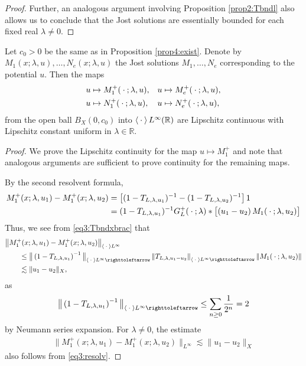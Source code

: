 \documentclass[../dissertation.tex]{subfiles}
\begin{document}
\begin{proof}
	Further, an analogous argument involving Proposition \ref{prop2:Tbndl} 
	also allows us to conclude that the Jost solutions are essentially 
	bounded for each fixed real $\lambda \ne 0$.
\end{proof}

\begin{lma}[Continuity in $u$]\label{lma4:cont}
	Let $c_0 > 0$ be the same as in Proposition \ref{prop4:exist}. Denote by 
	$M_1(x; \lambda, u), \ldots, N_e(x; \lambda, u)$ the Jost solutions
	$M_1, \ldots, N_e$ corresponding to the potential $u$. Then the maps
	\begin{align*}
		u &\mapsto M_1^+(\kern 0.5ex \cdot \kern 0.5ex; \lambda, u ), &
		u &\mapsto M_e^+(\kern 0.5ex \cdot \kern 0.5ex; \lambda, u ), \\ 
		u &\mapsto N_1^+(\kern 0.5ex \cdot \kern 0.5ex; \lambda, u ), & 
		u &\mapsto N_e^+(\kern 0.5ex \cdot \kern 0.5ex; \lambda, u ),
	\end{align*}
	from the open ball $B_X(0, c_0)$ into $\left\langle \kern 0.5ex \cdot \kern 0.5ex \right\rangle L^\infty(\mathbb R)$ are 
	Lipschitz continuous with Lipschitz constant uniform in 
	$\lambda \in \mathbb R$.
\end{lma}
\begin{proof}
	We prove the Lipschitz continuity for the map $u \mapsto M_1^+$ and note 
	that analogous arguments are sufficient to prove continuity for the 
	remaining maps.

	By the second resolvent formula,
	\begin{align}\label{eq3:resolv}
		M_1^+(x; \lambda, u_1) - M_1^+(x; \lambda, u_2)
			&= \left[ 
					(1-T_{L, \lambda, u_1})^{-1} -  (1-T_{L,\lambda, u_2})^{-1}
				\right] 1 \\
			&= (1-T_{L, \lambda, u_1})^{-1} G_L^+(\kern 0.5ex \cdot \kern 0.5ex; \lambda) * 
				\big[(u_1 - u_2) \, M_1(\kern 0.5ex \cdot \kern 0.5ex; \lambda, u_2) \big]
				\nonumber
	\end{align}
	Thus, we see from \eqref{eq3:Tbndxbrac} that
	\begin{align}
		&\big\|
			M_1^+(x; \lambda, u_1) - M_1^+(x; \lambda, u_2)
		\big\|_{\inn{\dotarg} L^\infty} 
				\nonumber\\
		&\qquad\leq 
			\big\|
				\left(1 - T_{L,\lambda,u_1}\right)^{-1}
			\big\|_{\inn{\dotarg} L^\infty\toitself}
			\left\|T_{L, \lambda,u_1-u_2}\right\|_{\inn{\dotarg} L^\infty\toitself}
			\|M_1(\dotarg; \lambda, u_2) \| \nonumber\\
		&\qquad\lesssim \|u_1 - u_2\|_X,
	\end{align}
	as 
	\begin{align*}
		\big\|
			\left(1 - T_{L,\lambda,u_1}\right)^{-1}
		\big\|_{\inn{\dotarg} L^\infty\toitself}
			\leq \sum_{n\geq 0} \frac{1}{2^n} = 2
	\end{align*}
	by Neumann series expansion. For $\lambda \ne 0$, the estimate
	\begin{align*}
		\big\|M_1^+(x; \lambda, u_1) - M_1^+(x; \lambda, u_2)\big\|_{L^\infty} 
			\lesssim \|u_1 - u_2\|_X
	\end{align*}
	also follows from \eqref{eq3:resolv}.
\end{proof}
\end{document}
